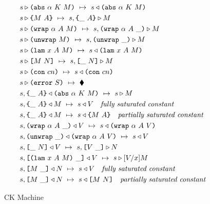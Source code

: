 \documentclass[../main.tex]{subfiles}
\begin{document}
\begin{figure*}[t]
    
    \begin{align*}
        &s \triangleright \texttt{(} \texttt{abs} ~ \alpha ~ K ~ M \texttt{)} ~\mapsto~ s \triangleleft \texttt{(} \texttt{abs} ~ \alpha ~ K ~ M \texttt{)}\\
        &s \triangleright \texttt{\{}M ~ A\texttt{\}} ~\mapsto~ s, \texttt{\{}\_ ~ A\texttt{\}} \triangleright M\\
        &s \triangleright \texttt{(} \texttt{wrap} ~ \alpha ~ A ~ M \texttt{)} ~\mapsto~ s, \texttt{(} \texttt{wrap} ~ \alpha ~ A ~ \_ \texttt{)} \triangleright M\\
        &s \triangleright \texttt{(} \texttt{unwrap} ~ M \texttt{)} ~\mapsto~ s, \texttt{(} \texttt{unwrap} ~ \_ \texttt{)}{} \triangleright M\\
        &s \triangleright \texttt{(} \texttt{lam} ~ x ~ A ~ M \texttt{)} ~\mapsto~ s \triangleleft \texttt{(} \texttt{lam} ~ x ~ A ~ M \texttt{)}\\
        &s \triangleright \texttt{[} M ~ N \texttt{]} ~\mapsto~ s, \texttt{[} \_ ~ N \texttt{]} \triangleright M\\
        &s \triangleright \texttt{(} \texttt{con} ~ cn \texttt{)} ~\mapsto~ s \triangleleft \texttt{(} \texttt{con} ~ cn \texttt{)}\\
        &s \triangleright \texttt{(} \texttt{error} ~ S \texttt{)} ~\mapsto~ \blacklozenge{}\\
        &s, \texttt{\{}\_ ~ A\texttt{\}} \triangleleft \texttt{(} \texttt{abs} ~ \alpha ~ K ~ M \texttt{)} ~\mapsto~ s \triangleright M\\
        &s, \texttt{\{}\_ ~ A\texttt{\}} \triangleleft M ~\mapsto~ s \triangleleft V \quad \textit{fully saturated constant}\\
        &s, \texttt{\{}\_ ~ A\texttt{\}} \triangleleft M ~\mapsto~ s \triangleleft \texttt{\{}M ~ A\texttt{\}} \quad \textit{partially saturated constant}\\
        &s, \texttt{(} \texttt{wrap} ~ \alpha ~ A ~ \_ \texttt{)} \triangleleft V ~\mapsto~ s \triangleleft \texttt{(} \texttt{wrap} ~ \alpha ~ A ~ V \texttt{)}\\
        &s, \texttt{(} \texttt{unwrap} ~ \_ \texttt{)}{} \triangleleft \texttt{(} \texttt{wrap} ~ \alpha ~ A ~ V \texttt{)} ~\mapsto~ s \triangleleft V\\
        &s, \texttt{[} \_ ~ N \texttt{]} \triangleleft V ~\mapsto~ s, \texttt{[} V ~ \_ \texttt{]} \triangleright N\\
        &s, \texttt{[} \texttt{(} \texttt{lam} ~ x ~ A ~ M \texttt{)} ~ \_ \texttt{]} \triangleleft V ~\mapsto~ s \triangleright [V/x]M\\
        &s,\texttt{[} M ~ \_ \texttt{]} \triangleleft N ~\mapsto~ s \triangleleft V \quad \textit{fully saturated constant}\\
        &s,\texttt{[} M ~ \_ \texttt{]} \triangleleft N ~\mapsto~ s \triangleleft \texttt{[} M ~ N \texttt{]} \quad \textit{partially saturated constant}\\
    \end{align*}
    
    \caption{CK Machine}
    \label{fig:Plutus_core_ck_machine}
\end{figure*}
\end{document}
